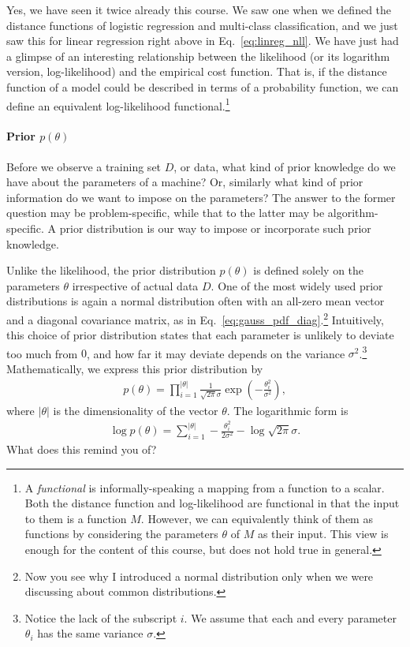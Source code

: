 \documentclass{report}
\begin{document}
Yes, we have seen it twice already this course. We saw one when we defined the
distance functions of logistic regression and multi-class classification, and we
just saw this for linear regression right above in Eq.~\eqref{eq:linreg_nll}.
We have just had a glimpse of an interesting relationship between the likelihood
(or its logarithm version, log-likelihood) and the empirical cost function. That
is, if the distance function of a model could be described in terms of
a probability function, we can define an equivalent log-likelihood
functional.\footnote{
    A {\it functional} is informally-speaking a mapping from a function to a
    scalar. Both the distance function and log-likelihood are functional in that
    the input to them is a function $M$. However, we can equivalently think of
    them as functions by considering the parameters $\theta$ of $M$ as their
    input. This view is enough for the content of this course, but does not hold
    true in general.
} 

\paragraph{Prior $p(\theta)$}

Before we observe a training set $D$, or data, what kind of prior knowledge do
we have about the parameters of a machine? Or, similarly what kind of prior
information do we want to impose on the parameters? The answer to the former
question may be problem-specific, while that to the latter may be
algorithm-specific. A prior distribution is our way to impose or incorporate
such prior knowledge. 

Unlike the likelihood, the prior distribution $p(\theta)$ is defined solely on
the parameters $\theta$ irrespective of actual data $D$. One of the most widely
used prior distributions is again a normal distribution often with an all-zero
mean vector and a diagonal covariance matrix, as in
Eq.~\eqref{eq:gauss_pdf_diag}.\footnote{
    Now you see why I introduced a normal distribution only when we were
    discussing about common distributions.
} Intuitively, this choice of prior distribution states that each parameter is
unlikely to deviate too much from $0$, and how far it may deviate depends on the
variance $\sigma^2$.\footnote{
    Notice the lack of the subscript $i$. We assume that each and every
    parameter $\theta_i$ has the same variance $\sigma$.
}
Mathematically, we express this prior distribution by
\begin{align*}
    p(\theta) = \prod_{i=1}^{|\theta|} \frac{1}{\sqrt{2\pi} \sigma} \exp \left(
    -\frac{\theta_i^2}{\sigma^2} \right),
\end{align*}
where $|\theta|$ is the dimensionality of the vector $\theta$. The logarithmic
form is 
\begin{align}
    \label{eq:logprior_gauss}
    \log p(\theta) = 
    \sum_{i=1}^{|\theta|} 
    -\frac{\theta_i^2}{2\sigma^2} - \log \sqrt{2\pi} \sigma.
\end{align}
What does this remind you of?
\end{document}
